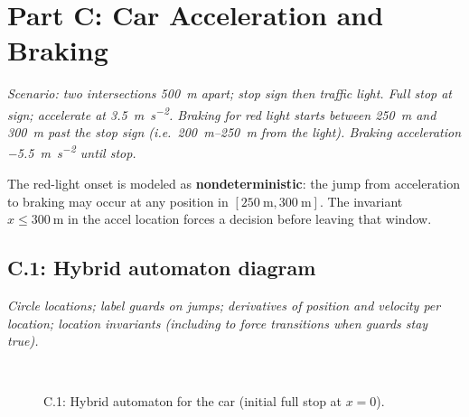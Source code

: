 \documentclass[10pt]{article}
\newcommand{\afterprompt}{\par\medskip}
\begin{document}
\section{Part C: Car Acceleration and Braking}

\noindent\textit{Scenario: two intersections \SI{500}{\meter} apart; stop sign then traffic light. Full stop at sign; accelerate at \SI{3.5}{\meter\per\second\squared}. Braking for red light starts between \SI{250}{\meter} and \SI{300}{\meter} past the stop sign (i.e.\ \SI{200}{\meter}--\SI{250}{\meter} from the light). Braking acceleration \SI{-5.5}{\meter\per\second\squared} until stop.}

The red-light onset is modeled as \textbf{nondeterministic}: the jump from acceleration to braking may occur at any position in $[\SI{250}{\meter},\SI{300}{\meter}]$. The invariant $x\le \SI{300}{\meter}$ in the accel location forces a decision before leaving that window.

\subsection*{C.1: Hybrid automaton diagram}
\textit{Circle locations; label guards on jumps; derivatives of position and velocity per location; location invariants (including to force transitions when guards stay true).}
\afterprompt
\begin{figure}[H]
\centering
{}\\[0.6em]
\caption{C.1: Hybrid automaton for the car (initial full stop at $x=0$).}
\label{fig:c1_diagram}
\end{figure}
\end{document}

